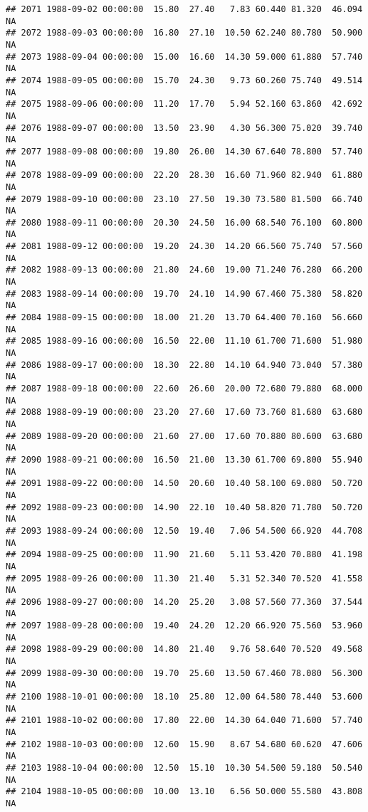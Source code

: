 \documentclass{article}\usepackage{graphicx, color}
\makeatletter
\newenvironment{kframe}{%
 \def\at@end@of@kframe{}%
 \ifinner\ifhmode%
  \def\at@end@of@kframe{\end{minipage}}%
  \begin{minipage}{\columnwidth}%
 \fi\fi%
 \def\FrameCommand##1{\hskip\@totalleftmargin \hskip-\fboxsep
 \colorbox{shadecolor}{##1}\hskip-\fboxsep
     \hskip-\linewidth \hskip-\@totalleftmargin \hskip\columnwidth}%
 \MakeFramed {\advance\hsize-\width
   \@totalleftmargin\z@ \linewidth\hsize
   \@setminipage}}%
 {\par\unskip\endMakeFramed%
 \at@end@of@kframe}
\newenvironment{knitrout}{}{} %
\makeatother
\begin{document}
\begin{knitrout}
\begin{kframe}
\begin{verbatim}
## 2071 1988-09-02 00:00:00  15.80  27.40   7.83 60.440 81.320  46.094     NA
## 2072 1988-09-03 00:00:00  16.80  27.10  10.50 62.240 80.780  50.900     NA
## 2073 1988-09-04 00:00:00  15.00  16.60  14.30 59.000 61.880  57.740     NA
## 2074 1988-09-05 00:00:00  15.70  24.30   9.73 60.260 75.740  49.514     NA
## 2075 1988-09-06 00:00:00  11.20  17.70   5.94 52.160 63.860  42.692     NA
## 2076 1988-09-07 00:00:00  13.50  23.90   4.30 56.300 75.020  39.740     NA
## 2077 1988-09-08 00:00:00  19.80  26.00  14.30 67.640 78.800  57.740     NA
## 2078 1988-09-09 00:00:00  22.20  28.30  16.60 71.960 82.940  61.880     NA
## 2079 1988-09-10 00:00:00  23.10  27.50  19.30 73.580 81.500  66.740     NA
## 2080 1988-09-11 00:00:00  20.30  24.50  16.00 68.540 76.100  60.800     NA
## 2081 1988-09-12 00:00:00  19.20  24.30  14.20 66.560 75.740  57.560     NA
## 2082 1988-09-13 00:00:00  21.80  24.60  19.00 71.240 76.280  66.200     NA
## 2083 1988-09-14 00:00:00  19.70  24.10  14.90 67.460 75.380  58.820     NA
## 2084 1988-09-15 00:00:00  18.00  21.20  13.70 64.400 70.160  56.660     NA
## 2085 1988-09-16 00:00:00  16.50  22.00  11.10 61.700 71.600  51.980     NA
## 2086 1988-09-17 00:00:00  18.30  22.80  14.10 64.940 73.040  57.380     NA
## 2087 1988-09-18 00:00:00  22.60  26.60  20.00 72.680 79.880  68.000     NA
## 2088 1988-09-19 00:00:00  23.20  27.60  17.60 73.760 81.680  63.680     NA
## 2089 1988-09-20 00:00:00  21.60  27.00  17.60 70.880 80.600  63.680     NA
## 2090 1988-09-21 00:00:00  16.50  21.00  13.30 61.700 69.800  55.940     NA
## 2091 1988-09-22 00:00:00  14.50  20.60  10.40 58.100 69.080  50.720     NA
## 2092 1988-09-23 00:00:00  14.90  22.10  10.40 58.820 71.780  50.720     NA
## 2093 1988-09-24 00:00:00  12.50  19.40   7.06 54.500 66.920  44.708     NA
## 2094 1988-09-25 00:00:00  11.90  21.60   5.11 53.420 70.880  41.198     NA
## 2095 1988-09-26 00:00:00  11.30  21.40   5.31 52.340 70.520  41.558     NA
## 2096 1988-09-27 00:00:00  14.20  25.20   3.08 57.560 77.360  37.544     NA
## 2097 1988-09-28 00:00:00  19.40  24.20  12.20 66.920 75.560  53.960     NA
## 2098 1988-09-29 00:00:00  14.80  21.40   9.76 58.640 70.520  49.568     NA
## 2099 1988-09-30 00:00:00  19.70  25.60  13.50 67.460 78.080  56.300     NA
## 2100 1988-10-01 00:00:00  18.10  25.80  12.00 64.580 78.440  53.600     NA
## 2101 1988-10-02 00:00:00  17.80  22.00  14.30 64.040 71.600  57.740     NA
## 2102 1988-10-03 00:00:00  12.60  15.90   8.67 54.680 60.620  47.606     NA
## 2103 1988-10-04 00:00:00  12.50  15.10  10.30 54.500 59.180  50.540     NA
## 2104 1988-10-05 00:00:00  10.00  13.10   6.56 50.000 55.580  43.808     NA

\end{verbatim}
\end{kframe}
\end{knitrout}
\end{document}
